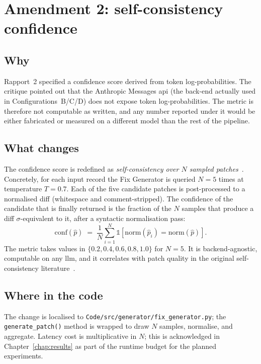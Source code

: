 \documentclass[12pt, a4paper]{report}
\begin{document}
\section{Amendment 2: self-consistency confidence}
\label{sec:selfconsistency}

\subsection{Why}

Rapport~2 specified a confidence score derived from token log-probabilities.
The critique pointed out that the Anthropic Messages \gls{api} (the
back-end actually used in Configurations~B/C/D) does not expose token
log-probabilities. The metric is therefore not computable as written, and
any number reported under it would be either fabricated or measured on a
different model than the rest of the pipeline.

\subsection{What changes}

The confidence score is redefined as \emph{self-consistency over $N$ sampled
patches}~\citep{wang2023selfconsistency}. Concretely, for each input record
the Fix Generator is queried $N=5$ times at temperature $T=0.7$. Each of the
five candidate patches is post-processed to a normalised diff (whitespace
and comment-stripped). The confidence of the candidate that is finally
returned is the fraction of the $N$ samples that produce a diff
$\sigma$-equivalent to it, after a syntactic normalisation pass:
\begin{equation}
  \mathrm{conf}(\hat{p}) \;=\;
  \frac{1}{N}\sum_{i=1}^{N}\mathbb{1}\!\left[\mathrm{norm}(\hat{p}_i) = \mathrm{norm}(\hat{p})\right].
  \label{eq:selfconf}
\end{equation}
The metric takes values in $\{0.2, 0.4, 0.6, 0.8, 1.0\}$ for $N=5$. It is
backend-agnostic, computable on any \gls{llm}, and it correlates with patch
quality in the original self-consistency literature~\citep{wang2023selfconsistency}.

\subsection{Where in the code}

The change is localised to
\texttt{Code/src/generator/fix\_generator.py}; the
\texttt{generate\_patch()} method is wrapped to draw $N$ samples, normalise,
and aggregate. Latency cost is multiplicative in $N$; this is acknowledged
in Chapter~\ref{chap:results} as part of the runtime budget for the planned
experiments.
\end{document}
